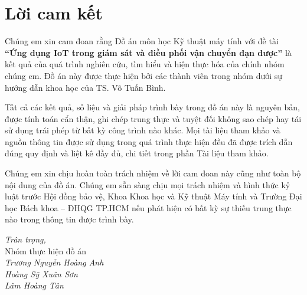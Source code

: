 \chapter*{Lời cam kết}
Chúng em xin cam đoan rằng Đồ án môn học Kỹ thuật máy tính với đề tài \textbf{“Ứng dụng IoT trong giám sát và điều phối vận chuyển đạn dược”} là kết quả của quá trình nghiên cứu, tìm hiểu và hiện thực hóa của chính nhóm chúng em. Đồ án này được thực hiện bởi các thành viên trong nhóm dưới sự hướng dẫn khoa học của TS. Võ Tuấn Bình.

Tất cả các kết quả, số liệu và giải pháp trình bày trong đồ án này là nguyên bản, được tính toán cẩn thận, ghi chép trung thực và tuyệt đối không sao chép hay tái sử dụng trái phép từ bất kỳ công trình nào khác. Mọi tài liệu tham khảo và nguồn thông tin được sử dụng trong quá trình thực hiện đều đã được trích dẫn đúng quy định và liệt kê đầy đủ, chi tiết trong phần Tài liệu tham khảo.

Chúng em xin chịu hoàn toàn trách nhiệm về lời cam đoan này cũng như toàn bộ nội dung của đồ án. Chúng em sẵn sàng chịu mọi trách nhiệm và hình thức kỷ luật trước Hội đồng bảo vệ, Khoa Khoa học và Kỹ thuật Máy tính và Trường Đại học Bách khoa – ĐHQG TP.HCM nếu phát hiện có bất kỳ sự thiếu trung thực nào trong thông tin được trình bày.

\begin{flushright}
\textit{Trân trọng,}\\
\vspace{0.5cm}
Nhóm thực hiện đồ án\\
\vspace{0.5cm}
\textit{Trương Nguyễn Hoàng Anh}\\
\textit{Hoàng Sỹ Xuân Sơn}\\
\textit{Lâm Hoàng Tân}
\end{flushright}